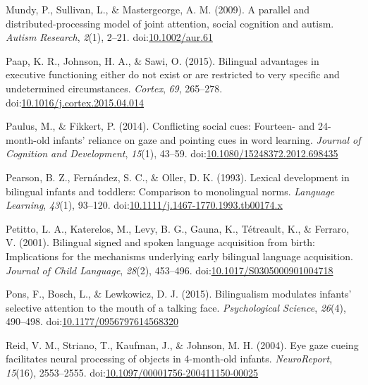 \documentclass[,man,floatsintext]{apa6}
\begin{document}
\leavevmode\hypertarget{ref-Mundy_etal_2009}{}%
Mundy, P., Sullivan, L., \& Mastergeorge, A. M. (2009). A parallel and distributed-processing model of joint attention, social cognition and autism. \emph{Autism Research}, \emph{2}(1), 2--21. doi:\href{https://doi.org/10.1002/aur.61}{10.1002/aur.61}

\leavevmode\hypertarget{ref-Paap_etal_2015}{}%
Paap, K. R., Johnson, H. A., \& Sawi, O. (2015). Bilingual advantages in executive functioning either do not exist or are restricted to very specific and undetermined circumstances. \emph{Cortex}, \emph{69}, 265--278. doi:\href{https://doi.org/10.1016/j.cortex.2015.04.014}{10.1016/j.cortex.2015.04.014}

\leavevmode\hypertarget{ref-Paulus_Fikkert_2014}{}%
Paulus, M., \& Fikkert, P. (2014). Conflicting social cues: Fourteen- and 24-month-old infants' reliance on gaze and pointing cues in word learning. \emph{Journal of Cognition and Development}, \emph{15}(1), 43--59. doi:\href{https://doi.org/10.1080/15248372.2012.698435}{10.1080/15248372.2012.698435}

\leavevmode\hypertarget{ref-Pearson_etal_1993}{}%
Pearson, B. Z., Fernández, S. C., \& Oller, D. K. (1993). Lexical development in bilingual infants and toddlers: Comparison to monolingual norms. \emph{Language Learning}, \emph{43}(1), 93--120. doi:\href{https://doi.org/10.1111/j.1467-1770.1993.tb00174.x}{10.1111/j.1467-1770.1993.tb00174.x}

\leavevmode\hypertarget{ref-Petitto_etal_2001}{}%
Petitto, L. A., Katerelos, M., Levy, B. G., Gauna, K., Tétreault, K., \& Ferraro, V. (2001). Bilingual signed and spoken language acquisition from birth: Implications for the mechanisms underlying early bilingual language acquisition. \emph{Journal of Child Language}, \emph{28}(2), 453--496. doi:\href{https://doi.org/10.1017/S0305000901004718}{10.1017/S0305000901004718}

\leavevmode\hypertarget{ref-Pons_etal_2015}{}%
Pons, F., Bosch, L., \& Lewkowicz, D. J. (2015). Bilingualism modulates infants' selective attention to the mouth of a talking face. \emph{Psychological Science}, \emph{26}(4), 490--498. doi:\href{https://doi.org/10.1177/0956797614568320}{10.1177/0956797614568320}

\leavevmode\hypertarget{ref-Reid_etal_2004}{}%
Reid, V. M., Striano, T., Kaufman, J., \& Johnson, M. H. (2004). Eye gaze cueing facilitates neural processing of objects in 4-month-old infants. \emph{NeuroReport}, \emph{15}(16), 2553--2555. doi:\href{https://doi.org/10.1097/00001756-200411150-00025}{10.1097/00001756-200411150-00025}
\end{document}
